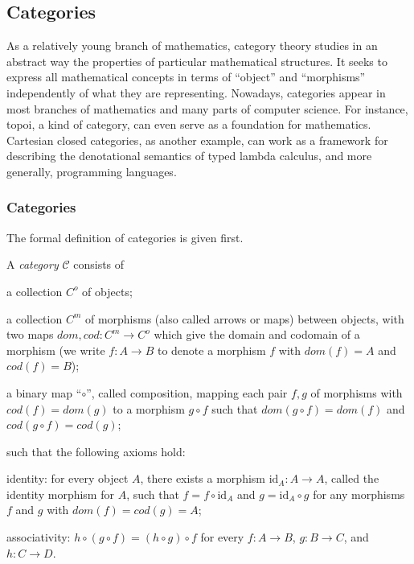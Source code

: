 \clearpage
\subsection{Categories}
\label{sec:bg_cat}
As a relatively young branch of mathematics, category theory studies in an abstract way the properties of particular mathematical structures. It seeks to express all mathematical concepts in terms of ``object'' and ``morphisms'' independently of what they are representing. Nowadays, categories appear in most branches of mathematics and many parts of computer science. For instance, topoi, a kind of category, can even serve as a foundation for mathematics. Cartesian closed categories, as another example, can work as a framework for describing the denotational semantics of typed lambda calculus, and more generally, programming languages.


\subsubsection{Categories}
\label{sec:bg_cat_c}
The formal definition of categories is given first.
\begin{definition}
\label{definition:category}
A \emph{category} $ \mathcal{C} $ consists of
\begin{myitemize}
\item a collection $ C^o $ of objects;
\item a collection $ C^m $ of morphisms (also called arrows or maps) between objects, with two maps $ dom, cod : C^m \to C^o $ which give the domain and codomain of a morphism (we write $ f : A \to B $ to denote a morphism $ f $ with $ dom(f) = A $ and $ cod(f) = B $);
\item a binary map ``$ \circ $'', called composition, mapping each pair $ f, g $ of morphisms with $ cod(f) = dom(g) $ to a morphism $ g \circ f $ such that $ dom(g \circ f) = dom(f) $ and $ cod(g \circ f) = cod(g) $;
\end{myitemize}
such that the following axioms hold:
\begin{myitemize}
\item identity: for every object $ A $, there exists a morphism $ \text{id}_A : A \to A $, called the identity morphism for $ A $, such that $ f = f \circ \text{id}_A $ and $ g = \text{id}_A \circ g $ for any morphisms $ f $ and $ g $ with $ dom(f) = cod(g) = A $;
\item associativity: $ h \circ (g \circ f) = (h \circ g) \circ f $ for every $ f: A \to B $, $ g: B \to C$, and $ h: C \to D $.
\end{myitemize}
\end{definition}

